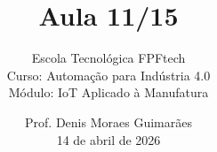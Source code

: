 
\title{Aula 11/15}

\subtitle{
\texorpdfstring{
\vspace{1.0cm}
Escola Tecnológica FPFtech\\
\vspace{0.5cm}
Curso: Automação para Indústria 4.0\\
\vspace{0.5cm}
Módulo: IoT Aplicado à Manufatura
\vspace{1.0cm}
}{
Escola Tecnológica FPFtech - Curso: Automação para Indústria 4.0 - Módulo: IoT Aplicado à Manufatura
}
}

\author{
Prof. Denis Moraes Guimarães\\
\small 14 de abril de 2026
}

\date{}